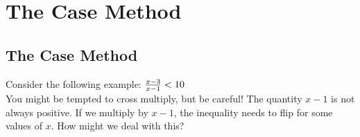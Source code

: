 \chapter{The Case Method}

\section{The Case Method}

Consider the following example: $ {x - 3 \over x - 1} < 10 $ \\

You might be tempted to cross multiply, but be careful! The quantity $ x - 1$ is not always positive. If we multiply by $ x - 1$, the inequality needs to flip for some values of $ x $. How might we deal with this? \\

